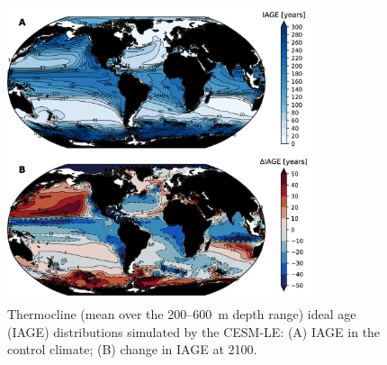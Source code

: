 \documentclass{report_chapter}
\begin{document}
\begin{figure}[tbp]
\centering
\includegraphics[width=0.8\textwidth]{cesm-thermocline-iage-change.png}
\caption{Thermocline (mean over the 200--600~m depth range) ideal age (IAGE) distributions simulated by the CESM-LE: (A) IAGE in the control climate; (B) change in IAGE at 2100.}
\label{fig:cesm-thermocline-iage-change}
\end{figure}
\end{document}
